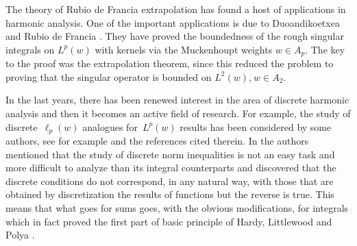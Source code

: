 \documentclass[a4paper]{amsart}
\theoremstyle{plain}
\numberwithin{equation}{section}
\begin{document}
The theory of Rubio de Francia extrapolation has found a host of
applications in harmonic analysis. One of the important applications is due
to Duoandikoetxea and Rubio de Francia \cite{71}. They have proved the
boundedness of the rough singular integrals on $L^{p}(w)$ with kernels via
the Muckenhoupt weights $w\in A_{p}$. The key to the proof was the
extrapolation theorem, since this reduced the problem to proving that the
singular operator is bounded on $L^{2}(w)$,$\ w\in A_{2}.$\ 

\bigskip

In the last years, there has been renewed interest in the area of discrete
harmonic analysis and then it becomes an active field of research. For
example, the study of discrete\ $\ell _{p}(w)$ analogues for\ $L^{p}(w)$
results has been considered by some authors, see for example \cite{3, 4, 5,
7, 19, PAMS, 23, 24, samir} and the references cited therein. In \cite{Benet}
the authors mentioned that the study of discrete norm inequalities is not an
easy task and more difficult to analyze than its integral counterparts and
discovered that the discrete conditions do not correspond, in any natural
way, with those that are obtained by discretization the results of functions
but the reverse is true. This means that what goes for sums goes, with the
obvious modifications, for integrals which in fact proved the first part of
basic principle of Hardy, Littlewood and Polya \cite[p. 11]{Hardy}.
\end{document}
